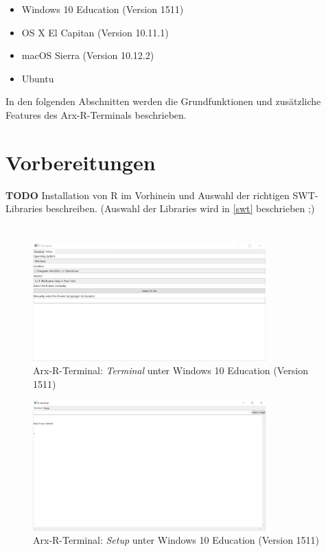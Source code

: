\documentclass[a4paper, 12pt]{report} %
\begin{document}
\begin{itemize}
\item Windows 10 Education (Version 1511)
\item OS X El Capitan (Version 10.11.1)
\item macOS Sierra (Version 10.12.2)
\item Ubuntu
\end{itemize}


In den folgenden Abschnitten werden die Grundfunktionen und zusätzliche Features des Arx-R-Terminals beschrieben. 

\section{Vorbereitungen}

\textbf{TODO} Installation von R im Vorhinein und Auswahl der richtigen SWT-Libraries beschreiben. (Auswahl der Libraries wird in \ref{swt}
 beschrieben ;)
 
\section{}

\begin{figure}[htpb]
\centering
\includegraphics[width=0.8\textwidth]{R-TerminalWindows}
\caption{Arx-R-Terminal: \textit{Terminal} unter Windows 10 Education (Version 1511)}
\label{rterminalwindows}
\end{figure}

\begin{figure}[htpb]
\centering
\includegraphics[width=0.8\textwidth]{rterminalwindows}
\caption{Arx-R-Terminal: \textit{Setup} unter Windows 10 Education (Version 1511)}
\label{rterminalwindows}
\end{figure}
\end{document}
